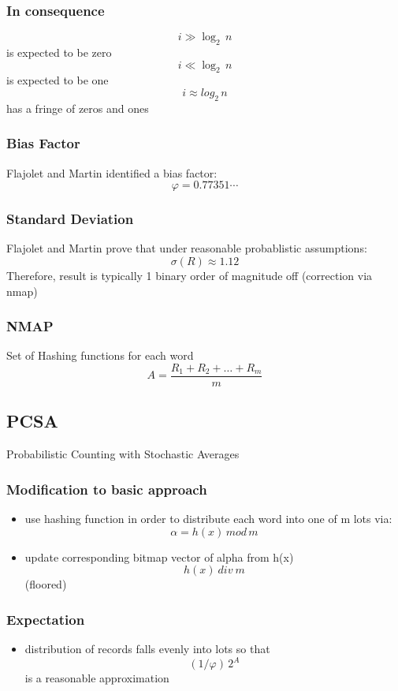 \documentclass[11pt]{article}
\begin{document}
\subsubsection*{In consequence}
\label{sec:org10504cd}
$$ i \gg \log_2\,n $$ is expected to be zero
$$ i \ll \log_2\,n $$ is expected to be one
$$ i \approx log_2\,n$$ has a fringe of zeros and ones
\subsubsection*{Bias Factor}
\label{sec:orge291dad}
Flajolet and Martin identified a bias factor:
$$ \varphi = 0.77351\cdots$$
\subsubsection*{Standard Deviation}
\label{sec:org7be49cc}
Flajolet and Martin prove that under reasonable probablistic assumptions:
$$ \sigma(R) \approx 1.12$$
Therefore, result is typically 1 binary order of magnitude off (correction via nmap)
\subsubsection*{NMAP}
\label{sec:orga26f4cd}
Set of Hashing functions for each word
$$  A = \frac{ R_1 + R_2 + \dots + R_m}m $$


\subsection*{PCSA}
\label{sec:org0713c8f}
Probabilistic Counting with Stochastic Averages
\subsubsection*{Modification to basic approach}
\label{sec:orgd7cab22}
\begin{itemize}
\item use hashing function in order to distribute each word into one of m lots via:
$$ \alpha = h(x)\,mod\,m$$
\item update corresponding bitmap vector of alpha from h(x)
$$ h(x)\: div\: m$$ (floored)
\end{itemize}
\subsubsection*{Expectation}
\label{sec:org292c374}
\begin{itemize}
\item distribution of records falls evenly into lots so that $$(1/\varphi)\,2^A$$ is a reasonable approximation
\end{itemize}
\end{document}
